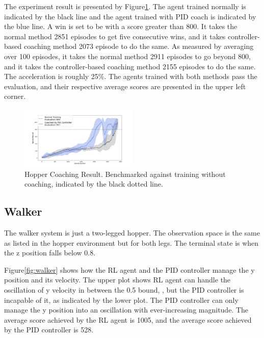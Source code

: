 \documentclass[journal]{IEEEtran}
\begin{document}
The experiment result is presented by Figure\ref{fig:hopper_result}. The agent trained normally is indicated by the black line and the agent trained with PID coach is indicated by the blue line. A win is set to be with a score greater than 800. It takes the normal method 2851 episodes to get five consecutive wins, and it takes controller-based coaching method 2073 episode to do the same. As measured by averaging over 100 episodes, it takes the normal method 2911 episodes to go beyond 800, and it takes the controller-based coaching method 2155 episodes to do the same. The acceleration is roughly 25\%. The agents trained with both methods pass the evaluation, and their respective average scores are presented in the upper left corner.


\begin{figure}
     \centering
      \includegraphics[width=0.5\textwidth]{hopper.png}
      \caption{Hopper Coaching Result. Benchmarked against training without coaching, indicated by the black dotted line.}
      \label{fig:hopper_result}
\end{figure}



\subsection{Walker}
The walker system is just a two-legged hopper. The observation space is the same as listed in the hopper environment but for both legs. The terminal state is when the z position falls below 0.8.

Figure\ref{fig:walker} shows how the RL agent and the PID controller manage the y position and its velocity. The upper plot shows RL agent can handle the oscillation of y velocity in between the 0.5 bound, , but the PID controller is incapable of it, as indicated by the lower plot. The PID controller can only manage the y position into an oscillation with ever-increasing magnitude. The average score achieved by the RL agent is 1005, and the average score achieved by the PID controller is 528.
\end{document}
